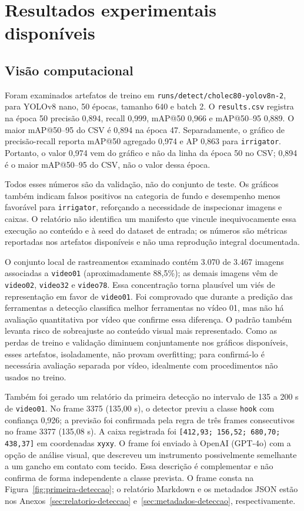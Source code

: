 \documentclass[12pt,a4paper]{article}
\begin{document}
\section{Resultados experimentais disponíveis}

\subsection{Visão computacional}

Foram examinados artefatos de treino em \texttt{runs/detect/cholec80-yolov8n-2}, para YOLOv8 nano, 50 épocas, tamanho 640 e batch 2. O \texttt{results.csv} registra na época 50 precisão 0,894, recall 0,999, mAP@50 0,966 e mAP@50--95 0,889. O maior mAP@50--95 do CSV é 0,894 na época 47. Separadamente, o gráfico de precisão-recall reporta mAP@50 agregado 0,974 e AP 0,863 para \texttt{irrigator}. Portanto, o valor 0,974 vem do gráfico e não da linha da época 50 no CSV; 0,894 é o maior mAP@50--95 do CSV, não o valor dessa época.

Todos esses números são da validação, não do conjunto de teste. Os gráficos também indicam falsos positivos na categoria de fundo e desempenho menos favorável para \texttt{irrigator}, reforçando a necessidade de inspecionar imagens e caixas. O relatório não identifica um manifesto que vincule inequivocamente essa execução ao conteúdo e à seed do dataset de entrada; os números são métricas reportadas nos artefatos disponíveis e não uma reprodução integral documentada.

O conjunto local de rastreamentos examinado contém 3.070 de 3.467 imagens associadas a \texttt{video01} (aproximadamente 88,5\%); as demais imagens vêm de \texttt{video02}, \texttt{video32} e \texttt{video78}. Essa concentração torna plausível um viés de representação em favor de \texttt{video01}. Foi comprovado que durante a predição das ferramentas a detecção classifica melhor ferramentas no vídeo 01, mas não há avaliação quantitativa por vídeo que confirme essa diferença. O padrão também levanta risco de sobreajuste ao conteúdo visual mais representado. Como as perdas de treino e validação diminuem conjuntamente nos gráficos disponíveis, esses artefatos, isoladamente, não provam overfitting; para confirmá-lo é necessária avaliação separada por vídeo, idealmente com procedimentos não usados no treino.

Também foi gerado um relatório da primeira detecção no intervalo de 135 a 200 s de \texttt{video01}. No frame 3375 (135,00 s), o detector previu a classe \texttt{hook} com confiança 0,926; a previsão foi confirmada pela regra de três frames consecutivos no frame 3377 (135,08 s). A caixa registrada foi \texttt{[412,93; 156,52; 680,70; 438,37]} em coordenadas \texttt{xyxy}. O frame foi enviado à OpenAI (GPT-4o) com a opção de análise visual, que descreveu um instrumento possivelmente semelhante a um gancho em contato com tecido. Essa descrição é complementar e não confirma de forma independente a classe prevista. O frame consta na Figura~\ref{fig:primeira-deteccao}; o relatório Markdown e os metadados JSON estão nos Anexos~\ref{sec:relatorio-deteccao} e~\ref{sec:metadados-deteccao}, respectivamente.
\end{document}
